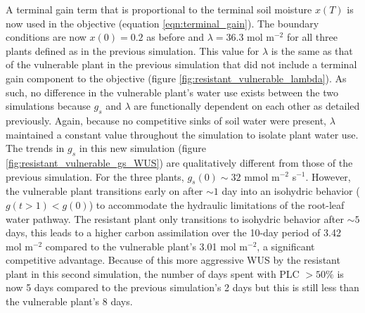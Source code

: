 \documentclass[utf8]{frontiersSCNS} %
\begin{document}
A terminal gain term that is proportional to the terminal soil moisture $x(T)$ is now used in the objective (equation \ref{eqn:terminal_gain}). The boundary conditions are now $x(0)=0.2$ as before and $\lambda=36.3$ mol m$^{-2}$ for all three plants defined as in the previous simulation. This value for $\lambda$ is the same as that of the vulnerable plant in the previous simulation that did not include a terminal gain component to the objective (figure \ref{fig:resistant_vulnerable_lambda}). As such, no difference in the vulnerable plant's water use exists between the two simulations because $g_s$ and $\lambda$ are functionally dependent on each other as detailed previously. Again, because no competitive sinks of soil water were present, $\lambda$ maintained a constant value throughout the simulation to isolate plant water use. The trends in $g_s$ in this new simulation (figure \ref{fig:resistant_vulnerable_gs_WUS}) are qualitatively different from those of the previous simulation. For the three plants, $g_s(0) \sim 32$ mmol m$^{-2}$ s$^{-1}$. However, the vulnerable plant transitions early on after $\sim 1$ day into an isohydric behavior ($g(t>1)<g(0)$) to accommodate the hydraulic limitations of the root-leaf water pathway. The resistant plant only transitions to isohydric behavior after $\sim 5$ days, this leads to a higher carbon assimilation over the 10-day period of 3.42 mol m$^{-2}$ compared to the vulnerable plant's 3.01 mol m$^{-2}$, a significant competitive advantage. Because of this more aggressive WUS by the resistant plant in this second simulation, the number of days spent with PLC $>50\%$ is now 5 days compared to the previous simulation's 2 days but this is still less than the vulnerable plant's 8 days.


\end{document}
